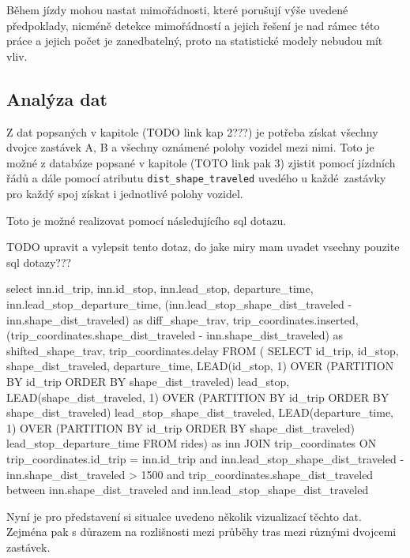 \bigbreak

Během jízdy mohou nastat mimořádnosti, které porušují výše uvedené předpoklady, nicméně detekce mimořádností a jejich řešení je nad rámec této práce a jejich počet je zanedbatelný, proto na statistické modely nebudou mít vliv.


\subsection{Analýza dat}

Z dat popsaných v kapitole (TODO link kap 2???) je potřeba získat všechny dvojce zastávek A, B a všechny oznámené polohy vozidel mezi nimi. Toto je možné z databáze popsané v kapitole (TOTO link pak 3) zjistit pomocí jízdních řádů a dále pomocí atributu \verb-dist_shape_traveled- uvedého u každé zastávky pro každý spoj získat i jednotlivé polohy vozidel.

\bigbreak

Toto je možné realizovat pomocí následujícího \gls{sql} dotazu.

TODO upravit a vylepsit tento dotaz, do jake miry mam uvadet vsechny pouzite sql dotazy???
\begin{code}[frame=none]
select inn.id_trip,
	inn.id_stop,
	inn.lead_stop,
	departure_time,
	inn.lead_stop_departure_time,
	(inn.lead_stop_shape_dist_traveled - inn.shape_dist_traveled) as diff_shape_trav,
	trip_coordinates.inserted,
	(trip_coordinates.shape_dist_traveled - inn.shape_dist_traveled) as shifted_shape_trav,
	trip_coordinates.delay
FROM (
	SELECT id_trip, id_stop, shape_dist_traveled, departure_time,
		LEAD(id_stop, 1) OVER (PARTITION BY id_trip ORDER BY shape_dist_traveled) lead_stop,
		LEAD(shape_dist_traveled, 1) OVER (PARTITION BY id_trip ORDER BY shape_dist_traveled) lead_stop_shape_dist_traveled,
		LEAD(departure_time, 1) OVER (PARTITION BY id_trip ORDER BY shape_dist_traveled) lead_stop_departure_time
	FROM rides) as inn
	JOIN trip_coordinates
	ON trip_coordinates.id_trip = inn.id_trip and inn.lead_stop_shape_dist_traveled - inn.shape_dist_traveled > 1500 and trip_coordinates.shape_dist_traveled between inn.shape_dist_traveled and inn.lead_stop_shape_dist_traveled
\end{code}

\bigbreak

Nyní je pro představení si situalce uvedeno několik vizualizací těchto dat. Zejména pak s důrazem na rozlišnosti mezi průběhy tras mezi různými dvojcemi zastávek.

\bigbreak

